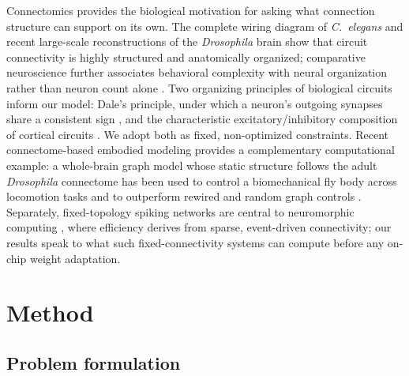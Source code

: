 \documentclass[10pt]{article}
\begin{document}
Connectomics provides the biological motivation for asking what connection
structure can support on its own. The complete wiring diagram of
\textit{C.\ elegans} \citep{white1986,varshney2011,cook2019} and recent
large-scale reconstructions of the \textit{Drosophila} brain
\citep{eichler2017,scheffer2020,dorkenwald2024} show that circuit connectivity
is highly structured and anatomically organized; comparative neuroscience
further associates behavioral complexity with neural organization rather than
neuron count alone
\citep{striedter2005,cisek2019}. Two organizing principles of biological
circuits inform our model: Dale's principle, under which a neuron's outgoing
synapses share a consistent sign \citep{eccles1976,strata1999}, and the characteristic
excitatory/inhibitory composition of cortical circuits
\citep{markram2004,harris2015}. We adopt both as fixed, non-optimized
constraints. Recent connectome-based embodied modeling provides a complementary
computational example: a whole-brain graph model whose static structure follows
the adult \textit{Drosophila} connectome has been used to control a
biomechanical fly body across locomotion tasks and to outperform rewired and
random graph controls \citep{jin2026}. Separately, fixed-topology spiking
networks are central to neuromorphic computing
\citep{maass1997,davies2018,roy2019,schuman2017}, where efficiency derives from
sparse, event-driven connectivity; our results speak to what such
fixed-connectivity systems can compute before any on-chip weight adaptation.

\section{Method}

\subsection{Problem formulation}
\label{sec:problem}
\end{document}
